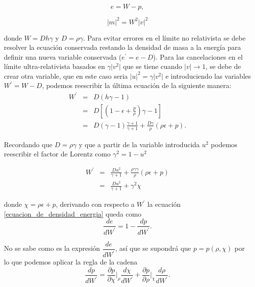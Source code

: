 \documentclass[12pt,a4paper]{book}
\providecommand{\abs}[1]{\lvert#1\rvert} %
\begin{document}
\begin{equation}\label{ecuacion_de_densidad_energia}
  e=W-p ,
\end{equation}

\begin{equation}\label{modulos de los momentos}
\abs{m}^2= W^{2}\abs{v}^{2}
\end{equation}

\noindent donde $W=D h \gamma$ y $D=\rho \gamma$. Para evitar errores en el límite no relativista se debe resolver la ecuación conservada restando la densidad de masa 
a la energía para definir una nueva variable conservada ($e^{'}=e-D$). Para las cancelaciones en el límite ultra-relativista basados en $\gamma \abs{v^2}$ que se tiene cuando $\abs{v} \rightarrow 1$, se debe de crear 
otra variable, que en este caso seria $\abs{u}^2=\gamma \abs{v^2}$ e introduciendo las variables $W^{'}=W-D$, podemos reescribir la última ecuación de la siguiente manera:
\begin{eqnarray*}
 W^{'}& = &D(h \gamma -1)\\
&=& D\left[ \left(1-\epsilon+ \frac{p}{\rho}\right) \gamma - 1 \right]\\
&=& D \left(\gamma-1 \right) \frac{\gamma+1}{\gamma+1}+\frac{D \gamma }{\rho}\left(\rho \epsilon + p \right).
\end{eqnarray*}

\noindent Recordando que $D=\rho \gamma$ y que a partir de la variable introducida $u^{2}$ podemos 
reescribir el factor de Lorentz como $\gamma^{2} = 1-u^{2}$

\begin{eqnarray}\label{W_prima}
\nonumber W^{'}&=&\frac{D u^{2}}{\gamma + 1}
+\frac{\rho\gamma \gamma}{ \rho }\left(\rho \epsilon + p \right)\\
&=& \frac{D u^{2}}{\gamma + 1} + \gamma^{2} \chi
\end{eqnarray}

\noindent donde $\chi=\rho \epsilon + p$, derivando con respecto a $W^{'}$ la ecuación \ref{ecuacion_de_densidad_energia} queda como
\begin{equation}\label{derivada_E_W}
\dfrac{de}{dW^{'}}=1-\dfrac{dp}{dW^{'}}.
\end{equation}

\noindent No se sabe como es la expresión $\dfrac{de}{dW^{'}}$, así que se supondrá que $p=p(\rho, \chi)$ por lo que podemos aplicar la regla de la cadena
\begin{equation}\label{cadena}
\dfrac{dp}{dW^{'}}=\dfrac{\partial p}{\partial\chi}\Bigg |_{\rho} \dfrac{d\chi}{dW^{'}} + \dfrac{\partial p}{\partial \rho}\Big |_{\chi} \dfrac{d \rho}{d W^{'}}.
\end{equation}
\end{document}
